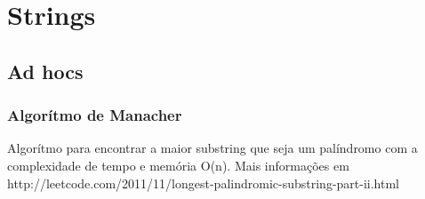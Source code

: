 \section{Strings}

\subsection{Ad hocs}
\subsubsection{Algorítmo de Manacher}
Algor\'{i}tmo para encontrar a maior substring que seja um pal\'{i}ndromo com a complexidade de tempo e mem\'{o}ria O(n).
Mais informa\c{c}\~{o}es em http://leetcode.com/2011/11/longest-palindromic-substring-part-ii.html

